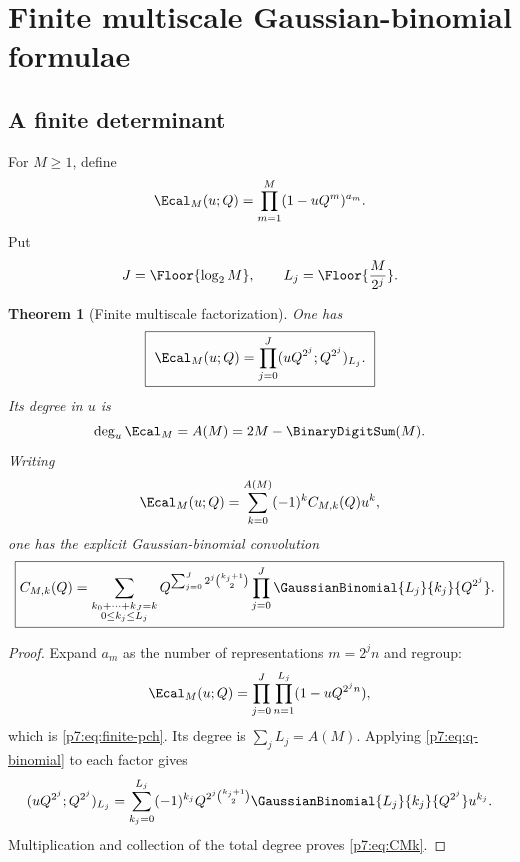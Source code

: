 \documentclass[11pt]{article}
\numberwithin{equation}{section}
\newtheorem{theorem}{Theorem}[section]
\theoremstyle{definition}
\theoremstyle{remark}
\begin{document}
\section{Finite multiscale Gaussian-binomial formulae}

\subsection{A finite determinant}

For $M\ge1$, define
\begin{equation}\label{p7:eq:EM}
 \Ecal_M(u;Q)=\prod_{m=1}^{M}(1-uQ^m)^{a_m}.
\end{equation}
Put
\[
 J=\Floor{\log_2M},
 \qquad
 L_j=\Floor{\frac{M}{2^j}}.
\]

\begin{theorem}[Finite multiscale factorization]\label{p7:thm:finite-E}
One has
\begin{equation}\label{p7:eq:finite-pch}
 \boxed{\ \Ecal_M(u;Q)
 =\prod_{j=0}^{J}(uQ^{2^j};Q^{2^j})_{L_j}.\ }
\end{equation}
Its degree in $u$ is
\begin{equation}\label{p7:eq:EM-degree}
 \deg_u\Ecal_M=A(M)=2M-\BinaryDigitSum(M).
\end{equation}
Writing
\begin{equation}\label{p7:eq:EM-coeff-def}
 \Ecal_M(u;Q)=\sum_{k=0}^{A(M)}(-1)^kC_{M,k}(Q)u^k,
\end{equation}
one has the explicit Gaussian-binomial convolution
\begin{equation}\label{p7:eq:CMk}
 \boxed{
 C_{M,k}(Q)=
 \sum_{\substack{k_0+\cdots+k_J=k\\0\le k_j\le L_j}}
 Q^{\sum_{j=0}^{J}2^j\binom{k_j+1}{2}}
 \prod_{j=0}^{J}\GaussianBinomial{L_j}{k_j}{Q^{2^j}}.\ }
\end{equation}
\end{theorem}

\begin{proof}
Expand $a_m$ as the number of representations $m=2^jn$ and regroup:
\[
 \Ecal_M(u;Q)
 =\prod_{j=0}^{J}\prod_{n=1}^{L_j}(1-uQ^{2^jn}),
\]
which is \cref{p7:eq:finite-pch}.  Its degree is $\sum_jL_j=A(M)$.  Applying \cref{p7:eq:q-binomial} to each factor gives
\[
 (uQ^{2^j};Q^{2^j})_{L_j}
 =\sum_{k_j=0}^{L_j}(-1)^{k_j}
 Q^{2^j\binom{k_j+1}{2}}
 \GaussianBinomial{L_j}{k_j}{Q^{2^j}}u^{k_j}.
\]
Multiplication and collection of the total degree proves \cref{p7:eq:CMk}.
\end{proof}
\end{document}
